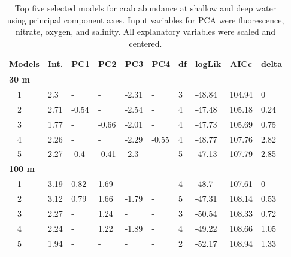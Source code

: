 \documentclass[letterpaper,12pt]{article}\usepackage[]{graphicx}\usepackage[]{color}
\begin{document}
\begin{landscape}
\centering\vspace*{\fill}
\begin{table}[!tbp]
{\scriptsize
\caption{Top five selected models for crab abundance at shallow and deep water using principal component axes. Input variables for PCA were fluorescence, nitrate, oxygen, and salinity. All explanatory variables were scaled and centered.\label{tab:abutabpca}} 
\begin{center}
\begin{tabular}{llllllllll}
\hline\hline
\multicolumn{1}{l}{Models}&\multicolumn{1}{c}{Int.}&\multicolumn{1}{c}{PC1}&\multicolumn{1}{c}{PC2}&\multicolumn{1}{c}{PC3}&\multicolumn{1}{c}{PC4}&\multicolumn{1}{c}{df}&\multicolumn{1}{c}{logLik}&\multicolumn{1}{c}{AICc}&\multicolumn{1}{c}{delta}\tabularnewline
\hline
{\bfseries 30 m}&&&&&&&&&\tabularnewline
~~1&2.3&-&-&-2.31&-&3&-48.84&104.94&0\tabularnewline
~~2&2.71&-0.54&-&-2.54&-&4&-47.48&105.18&0.24\tabularnewline
~~3&1.77&-&-0.66&-2.01&-&4&-47.73&105.69&0.75\tabularnewline
~~4&2.26&-&-&-2.29&-0.55&4&-48.77&107.76&2.82\tabularnewline
~~5&2.27&-0.4&-0.41&-2.3&-&5&-47.13&107.79&2.85\tabularnewline
\hline
{\bfseries 100 m}&&&&&&&&&\tabularnewline
~~1&3.19&0.82&1.69&-&-&4&-48.7&107.61&0\tabularnewline
~~2&3.12&0.79&1.66&-1.79&-&5&-47.31&108.14&0.53\tabularnewline
~~3&2.27&-&1.24&-&-&3&-50.54&108.33&0.72\tabularnewline
~~4&2.24&-&1.22&-1.89&-&4&-49.22&108.66&1.05\tabularnewline
~~5&1.94&-&-&-&-&2&-52.17&108.94&1.33\tabularnewline
\hline
\end{tabular}\end{center}}
\end{table}

\end{landscape}
\end{document}
